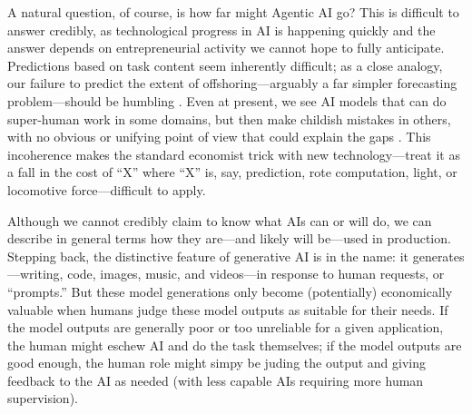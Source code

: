 \documentclass{article}
\begin{document}

A natural question, of course, is how far might Agentic AI go?
This is difficult to answer credibly, as technological progress in AI is happening quickly and the answer depends on entrepreneurial activity we cannot hope to fully anticipate.
Predictions based on task content seem inherently difficult; as a close analogy, our failure to predict the extent of offshoring---arguably a far simpler forecasting problem---should be humbling \citep{ozimek2019overboard}.
Even at present, we see AI models that can do super-human work in some domains, but then make childish mistakes in others, with no obvious or unifying point of view that could explain the gaps \citep{vafa2024large}.
This incoherence makes the standard economist trick with new technology---treat it as a fall in the cost of ``X'' where ``X'' is, say, prediction, rote computation, light, or locomotive force---difficult to apply.

Although we cannot credibly claim to know what AIs can or will do, we can describe in general terms how they are---and likely will be---used in production.
Stepping back, the distinctive feature of generative AI is in the name: it generates---writing, code, images, music, and videos---in response to human requests, or ``prompts.''
But these model generations only become (potentially) economically valuable when humans judge these model outputs as suitable for their needs.
If the model outputs are generally poor or too unreliable for a given application, the human might eschew AI and do the task themselves; if the model outputs are good enough, the human role might simpy be juding the output and giving feedback to the AI as needed (with less capable AIs requiring more human supervision).
\end{document}
